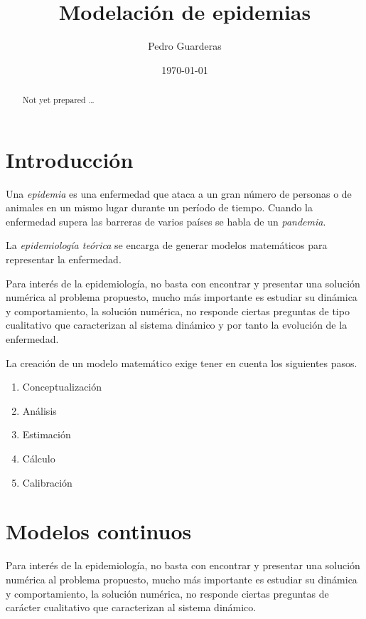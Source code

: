 \documentclass[a4paper, 10pt, twoside]{article}
\title{\fontsize{20}{20}\selectfont \textbf{Modelación de epidemias}}
\author{Pedro Guarderas}
\date{\today}
\begin{document}
\pagestyle{artsecstyle}

\maketitle
\tableofcontents

\begin{abstract}
Not yet prepared \ldots
\end{abstract}

\clearpage
\pagestyle{artstyle}
\section{Introducción}

Una \emph{epidemia} es una enfermedad que ataca a un gran número de personas o de animales en un 
mismo lugar durante un período de tiempo. Cuando la enfermedad supera las barreras de varios
países se habla de un \emph{pandemia}. 
\newline

La \emph{epidemiología teórica} se encarga de generar modelos matemáticos para representar la 
enfermedad.
\newline

Para interés de la epidemiología, no basta con encontrar y presentar una solución numérica al 
problema propuesto, mucho más importante es estudiar su dinámica y comportamiento, la solución 
numérica, no responde ciertas preguntas de tipo cualitativo que caracterizan al sistema 
dinámico y por tanto la evolución de la enfermedad.

La creación de un modelo matemático exige tener en cuenta los siguientes pasos.
\begin{enumerate}
	\item Conceptualización
	\item Análisis
	\item Estimación
	\item Cálculo
	\item Calibración
\end{enumerate}

\section{Modelos continuos}
Para interés de la epidemiología, no basta con encontrar y presentar una solución numérica al 
problema propuesto, mucho más importante es estudiar su dinámica y comportamiento, la solución 
numérica, no responde ciertas preguntas de carácter cualitativo que caracterizan al sistema 
dinámico.
\end{document}
